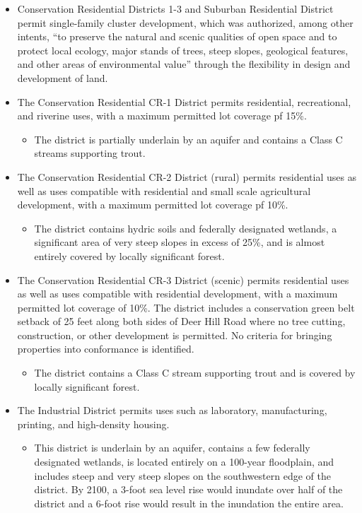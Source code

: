 \begin{itemize}
    \item Conservation Residential Districts 1-3 and Suburban Residential District permit single-family cluster development, which was authorized, among other intents, “to preserve the natural and scenic qualities of open space and to protect local ecology, major stands of trees, steep slopes, geological features, and other areas of environmental value” through the flexibility in design and development of land.
    \item The Conservation Residential CR-1 District permits residential, recreational, and riverine uses, with a maximum permitted lot coverage pf 15\%.
    \begin{itemize}
        \item The district is partially underlain by an aquifer and contains a Class C streams supporting trout.
        \end{itemize}
    \item The Conservation Residential CR-2 District (rural) permits residential uses as well as uses compatible with residential and small scale agricultural development, with a maximum permitted lot coverage pf 10\%. 
    \begin{itemize}
        \item The district contains hydric soils and federally designated wetlands, a significant area of very steep slopes in excess of 25\%, and is almost entirely covered by locally significant forest.
        \end{itemize}
    \item The Conservation Residential CR-3 District (scenic) permits residential uses as well as uses compatible with residential development, with a maximum permitted lot coverage of 10\%.  The district includes a conservation green belt setback of 25 feet along both sides of Deer Hill Road where no tree cutting, construction, or other development is permitted.  No criteria for bringing properties into conformance is identified.
    \begin{itemize}
        \item The district contains a Class C stream supporting trout and is covered by locally significant forest.
    \end{itemize}
    \item The Industrial District permits uses such as laboratory, manufacturing, printing, and high-density housing.
    \begin{itemize}
        \item This district is underlain by an aquifer, contains a few federally designated wetlands, is located entirely on a 100-year floodplain, and includes steep and very steep slopes on the southwestern edge of the district. By 2100, a 3-foot sea level rise would inundate over half of the district and a 6-foot rise would result in the inundation the entire area.

\end{itemize}
\end{itemize}
